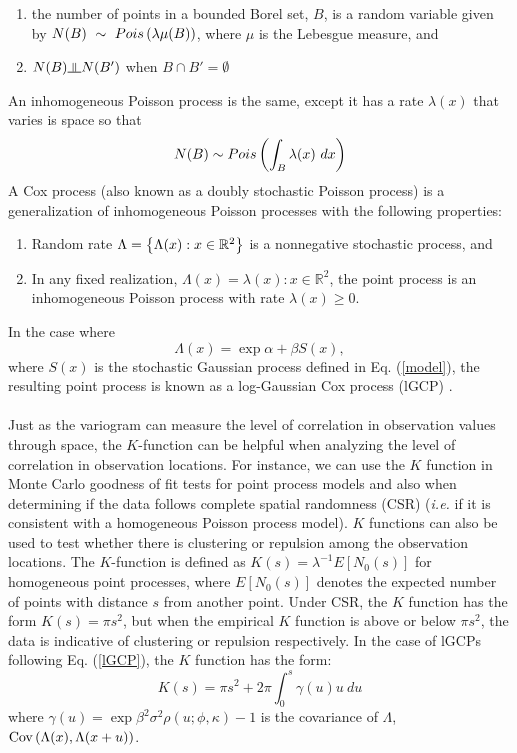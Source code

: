 \documentclass{uwstat572}
\begin{document}
\begin{enumerate}
\item the number of points in a bounded Borel set, $B$, is a random variable given by $N(B)~\sim~Pois \left( \lambda \mu(B) \right) $, where $\mu$ is the Lebesgue measure, and
\item $N(B) \indep N(B')$ when $B \cap B' = \emptyset$
\end{enumerate}
An inhomogeneous Poisson process is the same, except it has a rate $\lambda(x)$ that varies is space so that 
$$ N(B) \sim Pois \left( \int_B \lambda(x) \ dx \right) $$
A Cox process \citep{cox1955} (also known as a doubly stochastic Poisson process) is a generalization of inhomogeneous Poisson processes with the following properties:
\begin{enumerate}
\item Random rate $\Lambda = \left\{\Lambda(x) : x \in \mathbb{R}^2\right\}$ is a nonnegative stochastic process, and
\item In any fixed realization, $\Lambda(x) = \lambda(x) : x \in \mathbb{R}^2$, the point process is an inhomogeneous Poisson process with rate $\lambda(x) \geq 0$.
\end{enumerate}
In the case where
\begin{equation}
\Lambda(x) = \exp{\alpha + \beta S(x)},
\label{lGCP}
\end{equation}
where $S(x)$ is the stochastic Gaussian process defined in Eq. (\ref{model}), the resulting point process is known as a log-Gaussian Cox process (lGCP) \citep{diggle2010}.
\\\\
Just as the variogram can measure the level of correlation in observation values through space, the $K$-function can be helpful when analyzing the level of correlation in observation locations.  For instance, we can use the $K$ function in Monte Carlo goodness of fit tests for point process models \citep[Section 18.3]{handbook} and also when determining if the data follows complete spatial randomness (CSR) (\emph{i.e.} if it is consistent with a homogeneous Poisson process model).  $K$ functions can also be used to test whether there is clustering or repulsion among the observation locations.  The $K$-function is defined as $K(s) = \lambda^{-1} E[N_0(s)]$ for homogeneous point processes, where $E[N_0(s)]$ denotes the expected number of points with distance $s$ from another point.  Under CSR, the $K$ function has the form $K(s) = \pi s^2$, but when the empirical $K$ function is above or below $\pi s^2$, the data is indicative of clustering or repulsion respectively.  In the case of lGCPs following Eq. (\ref{lGCP}), the $K$ function has the form:
\begin{equation}
K(s) = \pi s^2 + 2 \pi \int_0^s \gamma(u) u \ du
\label{Kfun}
\end{equation}
where $\gamma(u) = \exp{\beta^2 \sigma^2 \rho(u ; \phi, \kappa)} - 1$ is the covariance of $\Lambda$, $\text{Cov}\left(\Lambda(x), \Lambda(x + u)\right)$.

%

\end{document}
